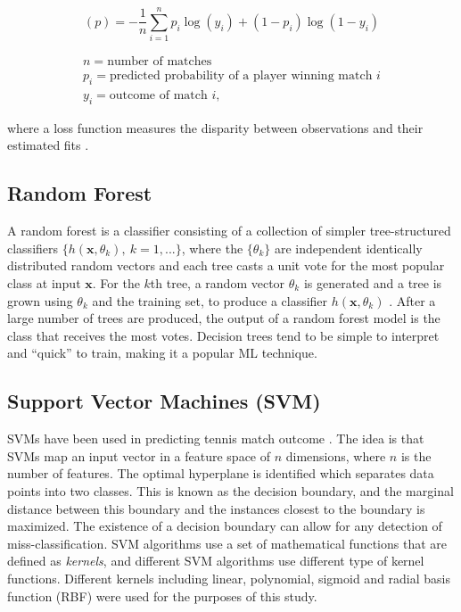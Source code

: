 \begin{equation}
    (p) = -\frac{1}{n} \sum_{i=1}^n p_i \log(y_i) + (1-p_i)\log(1-y_i)
\end{equation}

$$
\begin{gathered}
    n = \text{number of matches} \\
    p_i = \text{predicted probability of a player winning match $i$} \\
    y_i = \text{outcome of match $i$},
\end{gathered}
$$

where a loss function measures the disparity between observations and their estimated fits \cite{hazan2014logistic}.

\subsection{Random Forest}
A random forest is a classifier consisting of a collection of simpler tree-structured classifiers $\{h(\textbf{x},\theta_k),\ k=1,...\}$, where the $\{\theta_k\}$ are independent identically distributed random vectors and each tree casts a unit vote for the most popular class at input $\textbf{x}$. For the $k$th tree, a random vector $\theta_k$ is generated and a tree is grown using $\theta_k$ and the training set, to produce a classifier $h(\textbf{x}, \theta_k)$ \cite{breiman2001random}. After a large number of trees are produced, the output of a random forest model is the class that receives the most votes. Decision trees tend to be simple to interpret and ``quick'' to train, making it a popular ML technique.

\subsection{Support Vector Machines (SVM)}
SVMs have been used in predicting tennis match outcome \cite{cornman2017machine}. The idea is that SVMs map an input vector in a feature space of $n$ dimensions, where $n$ is the number of features. The optimal hyperplane is identified which separates data points into two classes. This is known as the decision boundary, and the marginal distance between this boundary and the instances closest to the boundary is maximized. The existence of a decision boundary can allow for any detection of miss-classification. SVM algorithms use a set of mathematical functions that are defined as \textit{kernels}, and different SVM algorithms use different type of kernel functions. Different kernels including linear, polynomial, sigmoid and radial basis function (RBF) were used for the purposes of this study.

